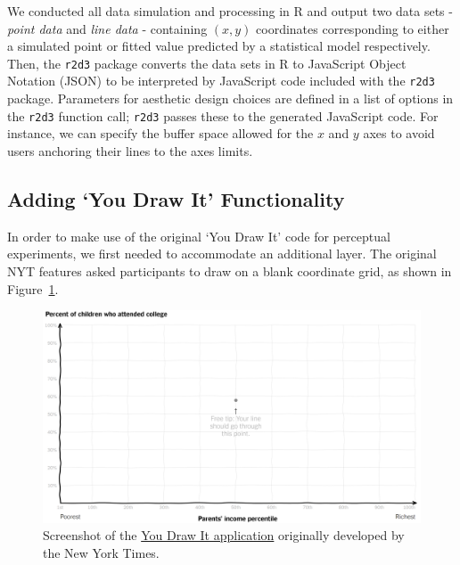 \documentclass[
]{jds}
\begin{document}
We conducted all data simulation and processing in R and output two data
sets - \emph{point data} and \emph{line data} - containing \((x, y)\)
coordinates corresponding to either a simulated point or fitted value
predicted by a statistical model respectively. Then, the \texttt{r2d3}
package converts the data sets in R to JavaScript Object Notation (JSON)
to be interpreted by JavaScript code included with the \texttt{r2d3}
package. Parameters for aesthetic design choices are defined in a list
of options in the \texttt{r2d3} function call; \texttt{r2d3} passes
these to the generated JavaScript code. For instance, we can specify the
buffer space allowed for the \(x\) and \(y\) axes to avoid users
anchoring their lines to the axes limits.

\hypertarget{adding-you-draw-it-functionality}{%
\subsection{Adding `You Draw It'
Functionality}\label{adding-you-draw-it-functionality}}

In order to make use of the original `You Draw It' code for perceptual
experiments, we first needed to accommodate an additional layer. The
original NYT features asked participants to draw on a blank coordinate
grid, as shown in Figure~\ref{fig-nyt-screenshot}.

\begin{figure}

{\centering \includegraphics{images/NYT-You-Draw-It-Screenshot.png}

}

\caption{\label{fig-nyt-screenshot}Screenshot of the
\href{https://www.nytimes.com/interactive/2015/05/28/upshot/you-draw-it-how-family-income-affects-childrens-college-chances.html}{You
Draw It application} originally developed by the New York Times.}

\end{figure}
\end{document}
